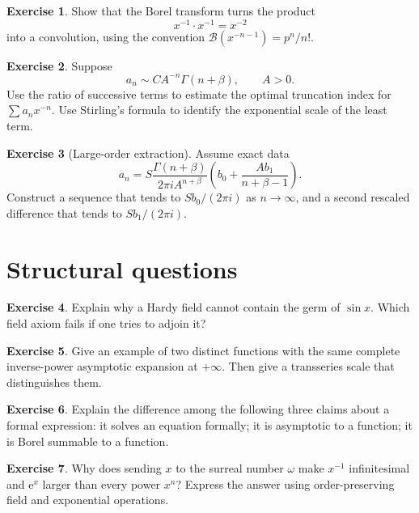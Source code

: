 \documentclass[11pt,openany]{book}
\theoremstyle{plain}
\theoremstyle{definition}
\newtheorem{exercise}{Exercise}[chapter]
\theoremstyle{remark}
\newcommand{\Borel}{\mathcal{B}}
\newcommand{\e}{\mathrm{e}}
\begin{document}
\begin{exercise}
Show that the Borel transform turns the product
\[
  x^{-1}\cdot x^{-1}=x^{-2}
\]
into a convolution, using the convention
$\Borel(x^{-n-1})=p^n/n!$.
\end{exercise}

\begin{exercise}
Suppose
\[
  a_n\sim C A^{-n}\Gamma(n+\beta),
  \qquad A>0.
\]
Use the ratio of successive terms to estimate the optimal truncation index for
$\sum a_nx^{-n}$. Use Stirling's formula to identify the exponential scale of the least term.
\end{exercise}

\begin{exercise}[Large-order extraction]
Assume exact data
\[
  a_n=S\frac{\Gamma(n+\beta)}{2\pi i A^{n+\beta}}
  \left(b_0+\frac{A b_1}{n+\beta-1}\right).
\]
Construct a sequence that tends to $Sb_0/(2\pi i)$ as $n\to\infty$, and a second rescaled difference that tends to $Sb_1/(2\pi i)$.
\end{exercise}

\section{Structural questions}

\begin{exercise}
Explain why a Hardy field cannot contain the germ of $\sin x$. Which field axiom fails if one tries to adjoin it?
\end{exercise}

\begin{exercise}
Give an example of two distinct functions with the same complete inverse-power asymptotic expansion at $+\infty$. Then give a transseries scale that distinguishes them.
\end{exercise}

\begin{exercise}
Explain the difference among the following three claims about a formal expression: it solves an equation formally; it is asymptotic to a function; it is Borel summable to a function.
\end{exercise}

\begin{exercise}
Why does sending $x$ to the surreal number $\omega$ make $x^{-1}$ infinitesimal and $\e^x$ larger than every power $x^n$? Express the answer using order-preserving field and exponential operations.
\end{exercise}
\end{document}
